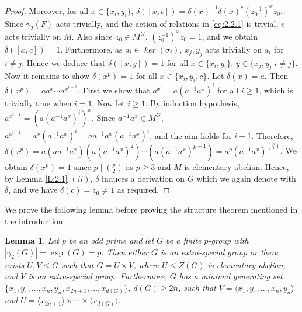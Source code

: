 \documentclass[preprint,sort&compress,12pt]{elsarticle}
\newtheorem{lemma}[theorem]{Lemma}
\theoremstyle{definition}
\numberwithin{equation}{theorem}
\DeclareMathOperator{\Ker}{\mathit{ker}}
\begin{document}
\begin{proof}
\noindent Moreover, for all $x\in \{x_i, y_i\}$, $\delta([x, c])=\delta(x)^{-1}\delta(x)^c (z_0^{-1})^xz_0$. Since $\gamma_2(F)$ acts trivially, and the action of relations in \eqref{eq:2.2.1} is trivial, $c$ acts trivially on $M$. Also since $z_0\in M^G$, $(z_0^{-1})^xz_0=1$, and we obtain $\delta([x, c])=1$. Furthermore, as $a_i\in \Ker(\sigma_i)$, $x_j, y_j$ acts trivially on $a_i$ for $i\neq j$. Hence we deduce that $\delta([x,y])=1$ for all $x\in \{x_i, y_i\}$, $y\in \{x_j, y_j| i\neq j\}$. Now it remains to show $\delta(x^p)=1$ for all $x\in \{x_i, y_i, c\}$. Let $\delta(x)=a$. Then $\delta(x^p)=aa^x\cdots a^{x^{p-1}}$. First we show that $a^{x^i}=a(a^{-1}a^x)^i$ for all $i\ge 1$, which is trivially true when $i=1$. Now let $i\ge 1$. By induction hypothesis, $a^{x^{i+1}}=(a(a^{-1}a^x)^i)^x$. Since $a^{-1}a^x\in M^G$, $a^{x^{i+1}}=a^x(a^{-1}a^x)^i=aa^{-1}a^x(a^{-1}a^x)^i$, and the aim holds for $i+1$. Therefore, $\delta(x^p)=a(aa^{-1}a^x)(a(a^{-1}a^x)^2)\cdots (a(a^{-1}a^x)^{p-1})=a^p(a^{-1}a^x)^{{p}\choose{2}}$. We obtain $\delta(x^p)=1$ since $p\mid {{p}\choose{2}}$ as $p\ge 3$ and $M$ is elementary abelian. Hence, by Lemma \ref{L:2.1} $(ii)$, $\delta$ induces a derivation on $G$ which we again denote with $\delta$, and we have $\delta(c)=z_0\neq 1$ as required.
 \end{proof}
 
We prove the following lemma before proving the structure theorem mentioned in the introduction.
\begin{lemma}\label{L:2.3}
Let $p$ be an odd prime and let $G$ be a finite $p$-group with $|\gamma_2(G)|=\exp(G)=p$. Then either $G$ is an extra-special group or there exists $U, V\le G$ such that $G=U\times V$, where $U\le Z(G)$ is elementary abelian, and $V$ is an extra-special group. Furthermore, $G$ has a minimal generating set $\{x_1, y_1, \ldots, x_n, y_n, x_{2n+1}, \ldots, x_{d(G)}\}$, $d(G)\ge 2n$, such that $V=\langle x_1, y_1, \ldots, x_n, y_n\rangle$ and $U=\langle x_{2n+1}\rangle \times\cdots\times \langle x_{d(G)}\rangle$.
\end{lemma}
\end{document}
